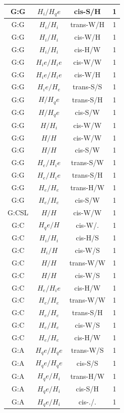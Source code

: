\begin{center}
\begin{longtable}{c|c|c|c}
G:G & $H_i/H_qe$ & cis-S/H & 1 \\  \hline
G:G & $H_i/H_i$ & trans-W/H & 1 \\  \hline
G:G & $H_i/H_i$ & cis-W/H & 1 \\  \hline
G:G & $H_i/H_i$ & cis-H/W & 1 \\  \hline
G:G & $H_ie/H_ie$ & cis-W/W & 1 \\  \hline
G:G & $H_ie/H_ie$ & cis-W/H & 1 \\  \hline
G:G & $H_ie/H_e$ & trans-S/S & 1 \\  \hline
G:G & $H/H_qe$ & trans-S/H & 1 \\  \hline
G:G & $H/H_qe$ & cis-S/W & 1 \\  \hline
G:G & $H/H_i$ & cis-W/W & 1 \\  \hline
G:G & $H/H$ & cis-W/W & 1 \\  \hline
G:G & $H/H$ & cis-S/W & 1 \\  \hline
G:G & $H_e/H_ie$ & trans-S/W & 1 \\  \hline
G:G & $H_e/H_ie$ & trans-S/H & 1 \\  \hline
G:G & $H_e/H_e$ & trans-H/W & 1 \\  \hline
G:G & $H_e/H_e$ & cis-S/W & 1 \\  \hline
G:CSL & $H/H$ & cis-W/W & 1 \\  \hline
G:C & $H_qe/H$ & cis-W/. & 1 \\  \hline
G:C & $H_i/H_i$ & cis-H/S & 1 \\  \hline
G:C & $H_i/H$ & cis-W/S & 1 \\  \hline
G:C & $H/H$ & trans-W/W & 1 \\  \hline
G:C & $H/H$ & cis-W/S & 1 \\  \hline
G:C & $H_e/H_ie$ & cis-H/W & 1 \\  \hline
G:C & $H_e/H_e$ & trans-W/W & 1 \\  \hline
G:C & $H_e/H_e$ & trans-S/H & 1 \\  \hline
G:C & $H_e/H_e$ & cis-W/S & 1 \\  \hline
G:C & $H_e/H_e$ & cis-H/W & 1 \\  \hline
G:A & $H_qe/H_qe$ & trans-W/S & 1 \\  \hline
G:A & $H_qe/H_qe$ & cis-S/S & 1 \\  \hline
G:A & $H_qe/H_i$ & trans-H/W & 1 \\  \hline
G:A & $H_qe/H_i$ & cis-S/H & 1 \\  \hline
G:A & $H_qe/H_i$ & cis-./. & 1 \\  \hline

\end{longtable}
\end{center}
